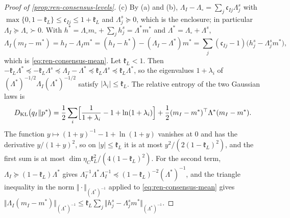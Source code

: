 \begin{proof}[Proof of \cref{prop:ren-consensus-levels}]
(c) By (a) and (b), $\Lambda_I-\Lambda_\circ=\sum_j\mathfrak c_{Ij}\Lambda^s_j$ with $\max\{0,1-\mathfrak k_L\}\le\mathfrak c_{Ij}\le1+\mathfrak k_L$ and $\Lambda^s_j\succeq0$, which is the enclosure; in particular $\Lambda_I\succeq\Lambda_\circ\succ0$. With $h^\ast=\Lambda_\circ m_\circ+\sum_jh^s_j=\Lambda^\ast m^\ast$ and $\Lambda^\ast=\Lambda_\circ+\Lambda^s$,
\[
\Lambda_I(m_I-m^\ast)=h_I-\Lambda_Im^\ast=(h_I-h^\ast)-(\Lambda_I-\Lambda^\ast)m^\ast=\sum_j(\mathfrak c_{Ij}-1)\bigl(h^s_j-\Lambda^s_jm^\ast\bigr),
\]
which is \eqref{eq:ren-consensus-mean}. Let $\mathfrak k_L<1$. Then $-\mathfrak k_L\Lambda^\ast\preceq-\mathfrak k_L\Lambda^s\preceq\Lambda_I-\Lambda^\ast\preceq\mathfrak k_L\Lambda^s\preceq\mathfrak k_L\Lambda^\ast$, so the eigenvalues $1+\lambda_i$ of $(\Lambda^\ast)^{-1/2}\Lambda_I(\Lambda^\ast)^{-1/2}$ satisfy $\lvert\lambda_i\rvert\le\mathfrak k_L$. The relative entropy of the two Gaussian laws is
\[
D_{\mathrm{KL}}\bigl(q_I\Vert p^\ast\bigr)=\frac12\sum_i\Bigl[\frac1{1+\lambda_i}-1+\ln(1+\lambda_i)\Bigr]+\frac12(m_I-m^\ast)^\top\Lambda^\ast(m_I-m^\ast).
\]
The function $y\mapsto(1+y)^{-1}-1+\ln(1+y)$ vanishes at $0$ and has the derivative $y/(1+y)^2$, so on $\lvert y\rvert\le\mathfrak k_L$ it is at most $y^2/(2(1-\mathfrak k_L)^2)$, and the first sum is at most $\dim\eta_C\mathfrak k_L^2/(4(1-\mathfrak k_L)^2)$. For the second term, $\Lambda_I\succeq(1-\mathfrak k_L)\Lambda^\ast$ gives $\Lambda_I^{-1}\Lambda^\ast\Lambda_I^{-1}\preceq(1-\mathfrak k_L)^{-2}(\Lambda^\ast)^{-1}$, and the triangle inequality in the norm $\Vert\cdot\Vert_{(\Lambda^\ast)^{-1}}$ applied to \eqref{eq:ren-consensus-mean} gives $\Vert\Lambda_I(m_I-m^\ast)\Vert_{(\Lambda^\ast)^{-1}}\le\mathfrak k_L\sum_j\Vert h^s_j-\Lambda^s_jm^\ast\Vert_{(\Lambda^\ast)^{-1}}$.


\end{proof}

